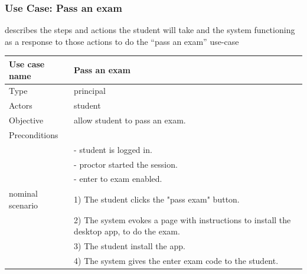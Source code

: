 \documentclass[]{uc2pfecaneva}
\begin{document}
    \begin{table}[h]
        \raggedright\subsubsection{Use Case: Pass an exam}
        describes the steps and actions the student will take and the system functioning as a response
        to those actions to do the “pass an exam” use-case\linebreak \\
        \begin{tabularx}{\textwidth}{|l|X|}
            \hline
            Use case name         & Pass an exam                                                                           \\ \hline
            Type                  & principal                                                                                         \\ \hline
            Actors                & student                                                                                           \\ \hline
            Objective             & allow student to pass an exam.                                                                    \\ \hline
            Preconditions         &                                                                                                   \\
            & - student is logged in.                                                                           \\
            & - proctor started the session.                                                                    \\
            & - enter to exam enabled.                                                                          \\ \hline
            nominal scenario
            & 1) The student clicks the "pass exam" button.                                                     \\
            & 2) The system evokes a page with instructions to install the desktop app, to do the exam.         \\
            & 3) The student install the app.                                                                   \\
            & 4) The system gives the enter exam code to the student.                                           \\

\end{tabularx}
\end{table}
\end{document}
